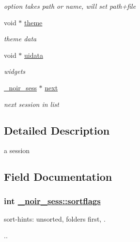 \begin{CompactItemize}
\begin{CompactList}\small\item\em option takes path or name, will set path+file \item\end{CompactList}\item 
\hypertarget{struct__noir__sess_o25}{
void $\ast$ \hyperlink{struct__noir__sess_o25}{theme}}
\label{struct__noir__sess_o25}

\begin{CompactList}\small\item\em theme data \item\end{CompactList}\item 
\hypertarget{struct__noir__sess_o26}{
void $\ast$ \hyperlink{struct__noir__sess_o26}{uidata}}
\label{struct__noir__sess_o26}

\begin{CompactList}\small\item\em widgets \item\end{CompactList}\item 
\hypertarget{struct__noir__sess_o27}{
\hyperlink{struct__noir__sess}{\_\-noir\_\-sess} $\ast$ \hyperlink{struct__noir__sess_o27}{next}}
\label{struct__noir__sess_o27}

\begin{CompactList}\small\item\em next session in list \item\end{CompactList}\end{CompactItemize}


\subsection{Detailed Description}
a session 



\subsection{Field Documentation}
\hypertarget{struct__noir__sess_o5}{
\subsubsection[sortflags]{\setlength{\rightskip}{0pt plus 5cm}int \hyperlink{struct__noir__sess_o5}{\_\-noir\_\-sess::sortflags}}}
\label{struct__noir__sess_o5}


sort-hints: unsorted, folders first, . 

.. 